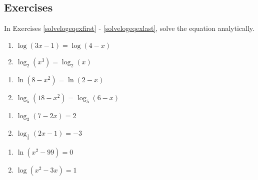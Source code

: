 \newpage
\subsection{Exercises}

In Exercises \ref{solvelogeqexfirst} - \ref{solvelogeqexlast}, solve the equation analytically.

\begin{multicols}{2}
\begin{enumerate}

\item $\log(3x-1) = \log(4-x)$  \label{solvelogeqexfirst}

\item $\log_{2}\left(x^{3}\right) = \log_{2}(x)$

\setcounter{HW}{\value{enumi}}
\end{enumerate}
\end{multicols}

\begin{multicols}{2}
\begin{enumerate}
\setcounter{enumi}{\value{HW}}

\item $\ln\left(8-x^2\right)=\ln(2-x)$

\item $\log_{5}\left(18-x^2\right) = \log_{5}(6-x)$

\setcounter{HW}{\value{enumi}}
\end{enumerate}
\end{multicols}

\begin{multicols}{2}
\begin{enumerate}
\setcounter{enumi}{\value{HW}}

\item $\log_{3}(7-2x) = 2$
\item $\log_{\frac{1}{2}} (2x-1) = -3$

\setcounter{HW}{\value{enumi}}
\end{enumerate}
\end{multicols}

\begin{multicols}{2}
\begin{enumerate}
\setcounter{enumi}{\value{HW}}

\item $\ln\left(x^2-99\right) = 0$
\item $\log(x^2-3x) = 1$

\setcounter{HW}{\value{enumi}}
\end{enumerate}
\end{multicols}

